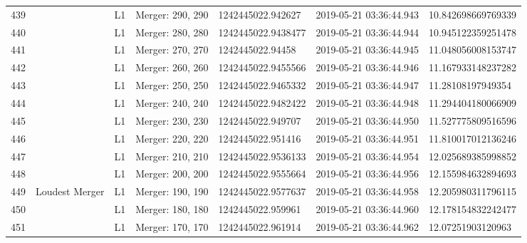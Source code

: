 \begin{longtable}{lllllll}
439  &                                                    &       L1 &  Merger: 290, 290 &   1242445022.942627 &  2019-05-21 03:36:44.943 &  10.842698669769339 \\
440  &                                                    &       L1 &  Merger: 280, 280 &  1242445022.9438477 &  2019-05-21 03:36:44.944 &  10.945122359251478 \\
441  &                                                    &       L1 &  Merger: 270, 270 &    1242445022.94458 &  2019-05-21 03:36:44.945 &  11.048056008153747 \\
442  &                                                    &       L1 &  Merger: 260, 260 &  1242445022.9455566 &  2019-05-21 03:36:44.946 &  11.167933148237282 \\
443  &                                                    &       L1 &  Merger: 250, 250 &  1242445022.9465332 &  2019-05-21 03:36:44.947 &   11.28108197949354 \\
444  &                                                    &       L1 &  Merger: 240, 240 &  1242445022.9482422 &  2019-05-21 03:36:44.948 &  11.294404180066909 \\
445  &                                                    &       L1 &  Merger: 230, 230 &   1242445022.949707 &  2019-05-21 03:36:44.950 &  11.527775809516596 \\
446  &                                                    &       L1 &  Merger: 220, 220 &   1242445022.951416 &  2019-05-21 03:36:44.951 &  11.810017012136246 \\
447  &                                                    &       L1 &  Merger: 210, 210 &  1242445022.9536133 &  2019-05-21 03:36:44.954 &  12.025689385998852 \\
448  &                                                    &       L1 &  Merger: 200, 200 &  1242445022.9555664 &  2019-05-21 03:36:44.956 &  12.155984632894693 \\
449  &                                     Loudest Merger &       L1 &  Merger: 190, 190 &  1242445022.9577637 &  2019-05-21 03:36:44.958 &  12.205980311796115 \\
450  &                                                    &       L1 &  Merger: 180, 180 &   1242445022.959961 &  2019-05-21 03:36:44.960 &  12.178154832242477 \\
451  &                                                    &       L1 &  Merger: 170, 170 &   1242445022.961914 &  2019-05-21 03:36:44.962 &   12.07251903120963 \\

\end{longtable}

